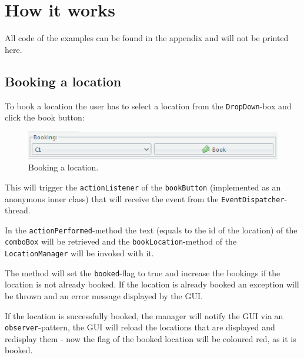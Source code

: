 \chapter{How it works}\label{ch:how_it_works} %

All code of the examples can be found in the appendix and will not be printed here.

\section{Booking a location}
\label{sec:booking}

To book a location the user has to select a location from the \texttt{DropDown}-box and click the book button:

\begin{figure}[H]
\begin{center}
\includegraphics[width=\textwidth]{gfx/booking.png} 
\end{center}
\caption{Booking a location.}
\label{fig:booking}
\end{figure}

This will trigger the \texttt{actionListener} of the \texttt{bookButton} (implemented as an anonymous inner class) that will receive the event from the \texttt{EventDispatcher}-thread.

In the \texttt{actionPerformed}-method the text (equals to the id of the location) of the \texttt{comboBox} will be retrieved and the \texttt{bookLocation}-method of the \texttt{LocationManager} will be invoked with it.

The method will set the \texttt{booked}-flag to true and increase the bookings if the location is not already booked. If the location is already booked an exception will be thrown and an error message displayed by the \ac{GUI}.

If the location is successfully booked, the manager will notify the \ac{GUI} via an \texttt{observer}-pattern, the \ac{GUI} will reload the locations that are displayed and redisplay them - now the flag of the booked location will be coloured red, as it is booked.

